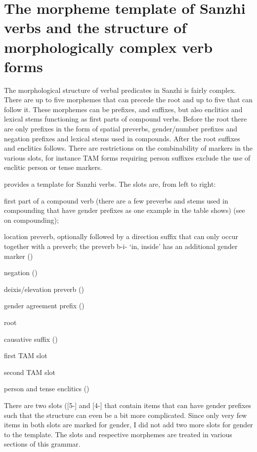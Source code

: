 
\section[The morpheme template of Sanzhi verbs]{The morpheme template of Sanzhi verbs and the structure of morphologically complex verb forms}
\label{sec:The morpheme template of Sanzhi verbs and the structure of morphologically complex verb forms}

The morphological structure of verbal predicates in Sanzhi is fairly complex. There are up to five morphemes that can precede the root and up to five that can follow it. These morphemes can be prefixes, and suffixes, but also enclitics and lexical stems functioning as first parts of compound verbs. Before the root there are only prefixes in the form of spatial preverbs, gender/number prefixes and negation prefixes and lexical stems used in compounds. After the root suffixes and enclitics follows. There are restrictions on the combinability of markers in the various slots, for instance TAM forms requiring person suffixes exclude the use of enclitic person or tense markers.

 provides a template for Sanzhi verbs. The slots are, from left to right:
%
\begin{description}[leftmargin=*]
	\item[5-]	first part of a compound verb (there are a few preverbs and stems used in compounding that have gender prefixes as one example in the table shows) (see  on compounding); 
	\item[4-]	location preverb, optionally followed by a direction suffix that can only occur together with a preverb; the preverb b-i- `in, inside' has an additional gender marker ()
	\item[3-]	negation ()
	\item[2-]	deixis/elevation preverb ()
	\item[1-]	gender agreement prefix ()
	\item[0]	root
	\item[-1]	causative suffix ()
	\item[-2]	first TAM slot 
	\item[-3]	second TAM slot 
	\item[-4]	person and tense enclitics ()
\end{description}
%
There are two slots ([5-] and [4-] that contain items that can have gender prefixes such that the structure can even be a bit more complicated. Since only very few items in both slots are marked for gender, I did not add two more slots for gender to the template. The slots and respective morphemes are treated in various sections of this grammar.
%

